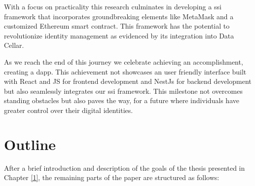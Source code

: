 With a focus on practicality this research culminates in developing a \gls{ssi} framework that incorporates groundbreaking elements like MetaMask and a customized Ethereum smart 
contract. This framework has the potential to revolutionize identity management as evidenced by its integration into Data Cellar.

As we reach the end of this journey we celebrate achieving an accomplishment, creating a \gls{dapp}. This achievement not showcases an user friendly interface 
built with React and JS for frontend development and NestJs for backend development but also seamlessly integrates our \gls{ssi} framework. This milestone not overcomes standing 
obstacles but also paves the way, for a future where individuals have greater control over their digital identities.

\section{Outline}

After a brief introduction and description of the goals of the thesis presented in Chapter \hyperref[ch:introduction]{[1]}, the remaining parts of the paper are structured as follows:

